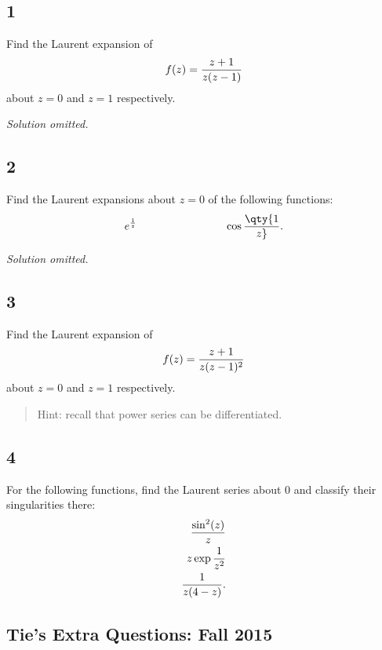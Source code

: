 \hypertarget{section-10}{%
\subsection{1}\label{section-10}}

Find the Laurent expansion of
\begin{align*}
f(z) = {z + 1 \over z(z-1)}
\end{align*}
about \(z=0\) and \(z=1\) respectively.

\emph{Solution omitted.}

\hypertarget{section-11}{%
\subsection{2}\label{section-11}}

Find the Laurent expansions about \(z=0\) of the following functions:
\begin{align*}
e^{1\over z} \hspace{8em} \cos \qty{1\over z}
.\end{align*}

\emph{Solution omitted.}

\hypertarget{section-12}{%
\subsection{3}\label{section-12}}

Find the Laurent expansion of
\begin{align*}
f(z) = {z+1 \over z(z-1)^2}
\end{align*}
about \(z=0\) and \(z=1\) respectively.

\begin{quote}
Hint: recall that power series can be differentiated.
\end{quote}

\hypertarget{section-13}{%
\subsection{4}\label{section-13}}

For the following functions, find the Laurent series about \(0\) and
classify their singularities there:
\begin{align*}
{\sin^2(z) \over z} \\
z \exp{1\over z^2} \\
{1 \over z(4-z)}
.\end{align*}

\hypertarget{ties-extra-questions-fall-2015}{%
\subsection{Tie's Extra Questions: Fall
2015}\label{ties-extra-questions-fall-2015}}

